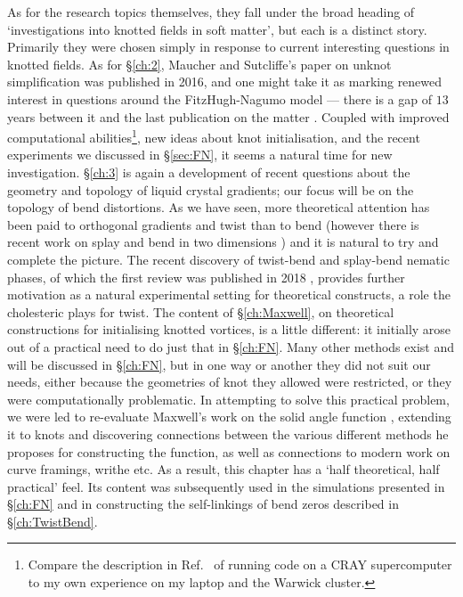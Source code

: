 As for the research topics themselves, they fall under the broad heading of `investigations into knotted fields in soft matter', but each is a distinct story. Primarily they were chosen simply in response to current interesting questions in knotted fields. As for \S\ref{ch:2}, Maucher and Sutcliffe's paper on unknot simplification \citep{Maucher2016} was published in 2016, and one might take it as marking renewed interest in questions around the FitzHugh-Nagumo model --- there is a gap of $13$ years between it and the last publication on the matter \citep{Sutcliffe2003}. Coupled with improved computational abilities\footnote{Compare the description in Ref.~\citep{Henze1993} of running code on a CRAY supercomputer to my own experience on my laptop and the Warwick cluster.}, new ideas about knot initialisation, and the recent experiments we discussed in \S \ref{sec:FN}, it seems a natural time for new investigation. \S\ref{ch:3} is again a development of recent questions about the geometry and topology of liquid crystal gradients; our focus will be on the topology of bend distortions. As we have seen, more theoretical attention has been paid to orthogonal gradients and twist \cite{Bellar2014,Machon2016, Machon2017} than to bend (however there is recent work on splay and bend in two dimensions \citep{Niv2018}) and it is natural to try and complete the picture. The recent discovery of twist-bend and splay-bend nematic phases, of which the first review was published in 2018 \citep{Lavrentovich2018}, provides further motivation as a natural experimental setting for theoretical constructs, a role the cholesteric plays for twist. The content of \S \ref{ch:Maxwell}, on theoretical constructions for initialising knotted vortices, is a little different: it initially arose out of a practical need to do just that in \S\ref{ch:FN}. Many other methods exist and will be discussed in \S\ref{ch:FN}, but in one way or another they did not suit our needs, either because the geometries of knot they allowed were restricted, or they were computationally problematic. In attempting to solve this practical problem, we were led to re-evaluate Maxwell's work on the solid angle function \citep{Maxwell2}, extending it to knots and discovering connections between the various different methods he proposes for constructing the function, as well as connections to modern work on curve framings, writhe etc. As a result, this chapter has a `half theoretical, half practical' feel. Its content was subsequently used in the simulations presented in \S\ref{ch:FN} and in constructing the self-linkings of bend zeros described in \S\ref{ch:TwistBend}.

